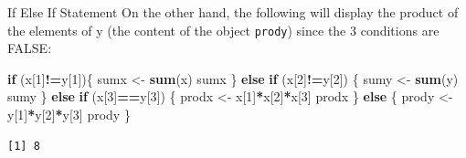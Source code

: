 \documentclass[
  ignorenonframetext,
]{beamer}
\newenvironment{Shaded}{\begin{snugshade}}{\end{snugshade}}
\newcommand{\ControlFlowTok}[1]{\textcolor[rgb]{0.13,0.29,0.53}{\textbf{#1}}}
\newcommand{\DecValTok}[1]{\textcolor[rgb]{0.00,0.00,0.81}{#1}}
\newcommand{\FunctionTok}[1]{\textcolor[rgb]{0.13,0.29,0.53}{\textbf{#1}}}
\newcommand{\NormalTok}[1]{#1}
\newcommand{\OtherTok}[1]{\textcolor[rgb]{0.56,0.35,0.01}{#1}}
\newcommand{\SpecialCharTok}[1]{\textcolor[rgb]{0.81,0.36,0.00}{\textbf{#1}}}
\begin{document}
\begin{frame}[fragile]{If Else If Statement}
\protect\hypertarget{if-else-if-statement-2}{}
On the other hand, the following will display the product of the
elements of y (the content of the object \texttt{prody}) since the 3
conditions are FALSE:

\small

\begin{Shaded}
\begin{Highlighting}[]
\ControlFlowTok{if}\NormalTok{ (x[}\DecValTok{1}\NormalTok{]}\SpecialCharTok{!=}\NormalTok{y[}\DecValTok{1}\NormalTok{])\{}
\NormalTok{  sumx }\OtherTok{\textless{}{-}} \FunctionTok{sum}\NormalTok{(x)}
\NormalTok{  sumx}
\NormalTok{    \} }\ControlFlowTok{else} \ControlFlowTok{if}\NormalTok{ (x[}\DecValTok{2}\NormalTok{]}\SpecialCharTok{!=}\NormalTok{y[}\DecValTok{2}\NormalTok{]) \{}
\NormalTok{  sumy }\OtherTok{\textless{}{-}} \FunctionTok{sum}\NormalTok{(y)}
\NormalTok{  sumy}
\NormalTok{   \} }\ControlFlowTok{else} \ControlFlowTok{if}\NormalTok{ (x[}\DecValTok{3}\NormalTok{]}\SpecialCharTok{==}\NormalTok{y[}\DecValTok{3}\NormalTok{]) \{}
\NormalTok{     prodx }\OtherTok{\textless{}{-}}\NormalTok{ x[}\DecValTok{1}\NormalTok{]}\SpecialCharTok{*}\NormalTok{x[}\DecValTok{2}\NormalTok{]}\SpecialCharTok{*}\NormalTok{x[}\DecValTok{3}\NormalTok{]}
\NormalTok{     prodx}
\NormalTok{   \} }\ControlFlowTok{else}\NormalTok{ \{}
\NormalTok{   prody }\OtherTok{\textless{}{-}}\NormalTok{ y[}\DecValTok{1}\NormalTok{]}\SpecialCharTok{*}\NormalTok{y[}\DecValTok{2}\NormalTok{]}\SpecialCharTok{*}\NormalTok{y[}\DecValTok{3}\NormalTok{]}
\NormalTok{   prody}
\NormalTok{\}}
\end{Highlighting}
\end{Shaded}

\begin{verbatim}
[1] 8
\end{verbatim}

\normalsize
\end{frame}
\end{document}
